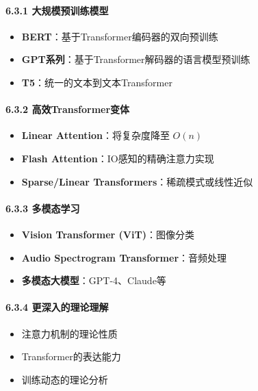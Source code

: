 \documentclass[11pt,a4paper]{article}
\begin{document}
\paragraph{6.3.1 大规模预训练模型}

\begin{itemize}
  \item \textbf{BERT}：基于Transformer编码器的双向预训练
  \item \textbf{GPT系列}：基于Transformer解码器的语言模型预训练
  \item \textbf{T5}：统一的文本到文本Transformer
\end{itemize}

\paragraph{6.3.2 高效Transformer变体}

\begin{itemize}
  \item \textbf{Linear Attention}：将复杂度降至 $O(n)$
  \item \textbf{Flash Attention}：IO感知的精确注意力实现
  \item \textbf{Sparse/Linear Transformers}：稀疏模式或线性近似
\end{itemize}

\paragraph{6.3.3 多模态学习}

\begin{itemize}
  \item \textbf{Vision Transformer (ViT)}：图像分类
  \item \textbf{Audio Spectrogram Transformer}：音频处理
  \item \textbf{多模态大模型}：GPT-4、Claude等
\end{itemize}

\paragraph{6.3.4 更深入的理论理解}

\begin{itemize}
  \item 注意力机制的理论性质
  \item Transformer的表达能力
  \item 训练动态的理论分析
\end{itemize}
\end{document}
